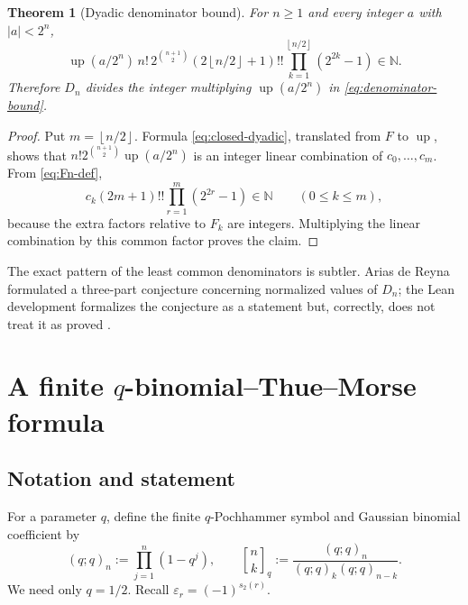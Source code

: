 \documentclass[11pt]{article}
\numberwithin{equation}{section}
\newtheorem{theorem}{Theorem}[section]
\theoremstyle{definition}
\theoremstyle{remark}
\newcommand{\N}{\mathbb N}
\newcommand{\upf}{\operatorname{up}}
\newcommand{\eps}{\varepsilon}
\newcommand{\GaussBinom}[3]{\genfrac{[}{]}{0pt}{}{#1}{#2}_{#3}}
\newcommand{\floor}[1]{\left\lfloor#1\right\rfloor}
\begin{document}
\begin{theorem}[Dyadic denominator bound]\label{thm:denominator-bound}
For $n\ge1$ and every integer $a$ with $|a|<2^n$,
\begin{equation}\label{eq:denominator-bound}
 \upf(a/2^n)\,n!\,2^{\binom{n+1}{2}}
 (2\floor{n/2}+1)!!
 \prod_{k=1}^{\floor{n/2}}(2^{2k}-1)
 \in\N.
\end{equation}
Therefore $D_n$ divides the integer multiplying $\upf(a/2^n)$ in \eqref{eq:denominator-bound}.
\end{theorem}

\begin{proof}
Put $m=\floor{n/2}$.  Formula \eqref{eq:closed-dyadic}, translated from $F$ to $\upf$, shows that
$n!2^{\binom{n+1}{2}}\upf(a/2^n)$ is an integer linear combination of $c_0,\ldots,c_m$.  From \eqref{eq:Fn-def},
\[
 c_k(2m+1)!!\prod_{r=1}^{m}(2^{2r}-1)\in\N
 \qquad(0\le k\le m),
\]
because the extra factors relative to $F_k$ are integers.  Multiplying the linear combination by this common factor proves the claim.
\end{proof}

The exact pattern of the least common denominators is subtler.  Arias de Reyna formulated a three-part conjecture concerning normalized values of $D_n$; the Lean development formalizes the conjecture as a statement but, correctly, does not treat it as proved \cite{Arias06487,ProveIt}.

\section{A finite $q$-binomial--Thue--Morse formula}\label{sec:qbinomial}

\subsection{Notation and statement}

For a parameter $q$, define the finite $q$-Pochhammer symbol and Gaussian binomial coefficient by
\begin{equation}\label{eq:q-notation}
 (q;q)_n:=\prod_{j=1}^{n}(1-q^j),
 \qquad
 \GaussBinom{n}{k}{q}:=\frac{(q;q)_n}{(q;q)_k(q;q)_{n-k}}.
\end{equation}
We need only $q=1/2$.  Recall $\eps_r=(-1)^{s_2(r)}$.
\end{document}
